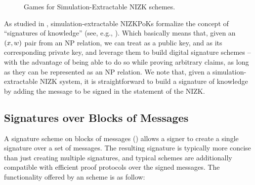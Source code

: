 \begin{figure}[ht!]
{\begin{minipage}[t]{0.5\textwidth}
    \end{minipage}
  }
  \label{fig:nizk-games}
  \caption{Games for Simulation-Extractable NIZK schemes.}
\end{figure}

As studied in \cite{cl06}, simulation-extractable NIZKPoKs formalize the concept
of ``signatures of knowledge'' (see, e.g., \cite{cs97}). Which basically means
that, given an $(x,w)$ pair from an NP relation, we can treat \NIZKx
as a public key, and \NIZKw as its corresponding private key, and leverage them
to build digital signature schemes -- with the advantage of being able to do so
while proving arbitrary claims, as long as they can be represented as an NP
relation. We note that, given a simulation-extractable NIZK system, it is
straightforward to build a signature of knowledge by adding the message to be
signed in the statement of the NIZK.

\iffalse
\subsection{Signatures over Blocks of Messages}
\label{sapp:sbm}

A signature scheme on blocks of messages (\SBM) allows a signer to create a
single signature over a set of messages. The resulting signature is typically
more concise than just creating multiple signatures, and typical schemes
\cite{cl02,asm06,ps16} are additionally compatible with efficient proof
protocols over the signed messages. The functionality offered by an \SBM scheme
is as follow:

